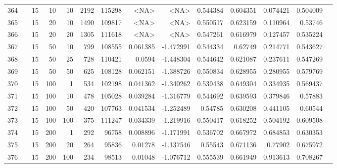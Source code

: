 \begin{longtable}{llrrrrrrrrrrrr}
		364 & &           15 &                10 &           10 &           2192 &     115298 &      <NA> &      <NA> &  0.544384 &    0.604351 &       0.074421 &  0.504009 \\
		365 & &           15 &                20 &           10 &           1490 &     109817 &      <NA> &      <NA> &  0.550517 &    0.623159 &       0.110964 &   0.53746 \\
		366 & &           15 &                20 &           20 &           1305 &     111618 &      <NA> &      <NA> &  0.547261 &    0.616979 &       0.127457 &  0.535224 \\
		367 & &           15 &                50 &           10 &         799 &     108555 &  0.061385 & -1.472991 &  0.544334 &     0.62749 &       0.214771 &  0.543627 \\
		368 & &           15 &                50 &           25 &         728 &     110421 &    0.0594 & -1.448304 &  0.544642 &    0.621087 &       0.237611 &  0.547269 \\
		369 & &           15 &                50 &           50 &         625 &     108128 &  0.062151 & -1.388726 &  0.550834 &    0.628955 &       0.280955 &  0.579769 \\
		370 & &           15 &               100 &            1 &         534 &     102198 &  0.041362 & -1.340262 &  0.539438 &    0.649304 &       0.334935 &  0.569437 \\
		371 & &           15 &               100 &           10 &         478 &     105028 &  0.039284 & -1.316779 &  0.544692 &    0.639593 &       0.379846 &   0.57883 \\
		372 & &           15 &               100 &           50 &         420 &     107763 &  0.041534 & -1.252489 &   0.54785 &    0.630208 &       0.441105 &   0.60544 \\
		373 & &           15 &               100 &          100 &         375 &     111247 &  0.034339 & -1.219916 &  0.550417 &    0.618252 &       0.504192 &  0.609508 \\
		374 & &           15 &               200 &            1 &         292 &      96758 &  0.008896 & -1.171991 &  0.536702 &    0.667972 &       0.684853 &  0.630353 \\
		375 & &           15 &               200 &           20 &         264 &      95836 &   0.01278 & -1.137546 &   0.55543 &    0.671136 &        0.77902 &  0.675972 \\
		376 & &           15 &               200 &          100 &         234 &      98513 &   0.01048 & -1.076712 &  0.555539 &    0.661949 &       0.913613 &  0.708267 \\

\end{longtable}
